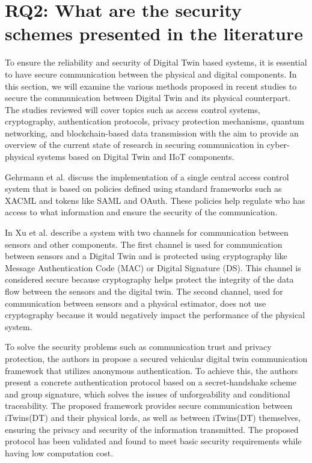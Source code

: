 %
%
\section{RQ2: What are the security schemes presented in the literature }

To ensure the reliability and security of Digital Twin based systems, it is essential to have secure communication between the physical and digital components. In this section, we will examine the various methods proposed in recent studies to secure the communication between Digital Twin and its physical counterpart. The studies reviewed will cover topics such as access control systems, cryptography, authentication protocols, privacy protection mechanisms, quantum networking, and blockchain-based data transmission with the aim to provide an overview of the current state of research in securing communication in cyber-physical systems based on Digital Twin and IIoT components.

Gehrmann et al.\cite{gehrmannDigitalTwinBased2020} discuss the implementation of a single central access control system that is based on policies defined using standard frameworks such as XACML and tokens like SAML and OAuth. These policies help regulate who has access to what information and ensure the security of the communication.  

In\cite{xuGametheoreticApproachSecure2020} Xu et al. describe a system with two channels for communication between sensors and other components. The first channel is used for communication between sensors and a Digital Twin and is protected using cryptography like Message Authentication Code (MAC) or Digital Signature (DS). This channel is considered secure because cryptography helps protect the integrity of the data flow between the sensors and the digital twin. The second channel, used for communication between sensors and a physical estimator, does not use cryptography because it would negatively impact the performance of the physical system.  

To solve the security problems such as communication trust and privacy protection, the authors in\cite{xuEfficientAuthenticationVehicular2021} propose a secured vehicular digital twin communication framework that utilizes anonymous authentication. To achieve this, the authors present a concrete authentication protocol based on a secret-handshake scheme and group signature, which solves the issues of unforgeability and conditional traceability. The proposed framework provides secure communication between iTwins(DT) and their physical lords, as well as between iTwins(DT) themselves, ensuring the privacy and security of the information transmitted. The proposed protocol has been validated and found to meet basic security requirements while having low computation cost.  

